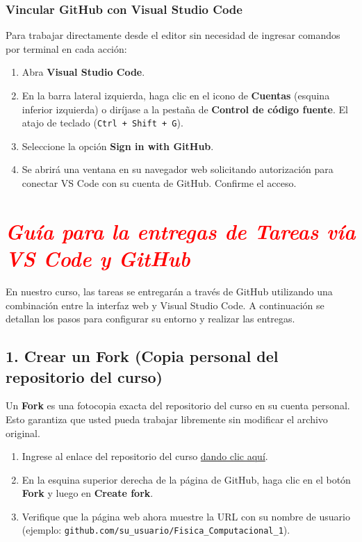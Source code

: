 \documentclass[12pt]{article}
\begin{document}
\subsubsection*{Vincular GitHub con Visual Studio Code}
Para trabajar directamente desde el editor sin necesidad de ingresar 
comandos por terminal en cada acción:
\begin{enumerate}
\item Abra \textbf{Visual Studio Code}.
\item En la barra lateral izquierda, haga clic en el icono de \textbf{Cuentas} 
(esquina inferior izquierda) o diríjase a la pestaña de 
\textbf{Control de código fuente}. El atajo de teclado (\lstinline|Ctrl + Shift + G|).
\item Seleccione la opción \textbf{Sign in with GitHub}.
\item Se abrirá una ventana en su navegador web solicitando autorización para conectar VS Code con su cuenta de GitHub. Confirme el acceso.
\end{enumerate}

\section*{\textcolor{red}{\textit{Guía para la entregas de Tareas vía VS Code y GitHub}}}
En nuestro curso, las tareas se entregarán a través de GitHub utilizando una combinación entre 
la interfaz web y Visual Studio Code. 
A continuación se detallan los pasos para configurar su entorno y realizar las entregas.

\subsection*{1. Crear un Fork (Copia personal del repositorio del curso)}
Un \textbf{Fork} es una fotocopia exacta del repositorio del curso en su cuenta personal. 
Esto garantiza que usted pueda trabajar libremente sin modificar el archivo original.

\begin{enumerate}[label=\arabic*)]
    \item Ingrese al enlace del repositorio del curso 
    \href{https://github.com/longas14/Fisica_Computacional_1}{dando clic aquí}.
    \item En la esquina superior derecha de la página de GitHub, haga clic en el botón 
    \textbf{Fork} y luego en \textbf{Create fork}.
    \item Verifique que la página web ahora muestre la URL con su nombre de usuario\\
    (ejemplo: \texttt{github.com/su\_usuario/Fisica\_Computacional\_1}).
\end{enumerate}
\end{document}
